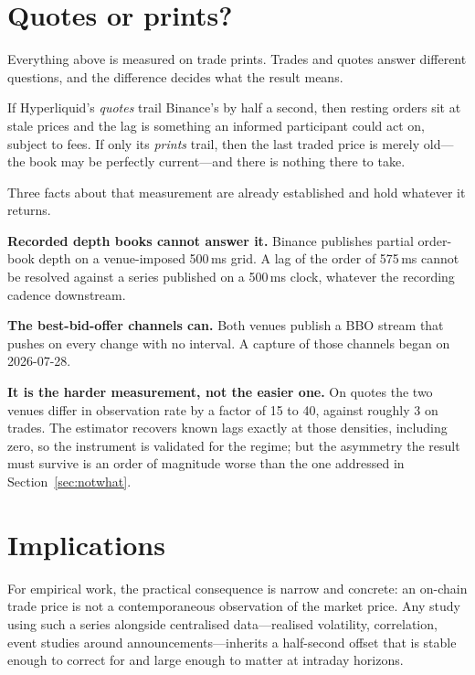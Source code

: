 \documentclass[11pt,a4paper]{article}
\begin{document}
\section{Quotes or prints?}
\label{sec:quotes}


Everything above is measured on trade prints. Trades and quotes answer different questions, and
the difference decides what the result means.

If Hyperliquid's \emph{quotes} trail Binance's by half a second, then resting orders sit at stale
prices and the lag is something an informed participant could act on, subject to fees. If only its
\emph{prints} trail, then the last traded price is merely old---the book may be perfectly
current---and there is nothing there to take.

Three facts about that measurement are already established and hold whatever it returns.

\textbf{Recorded depth books cannot answer it.} Binance publishes partial order-book depth on a
venue-imposed 500\,ms grid. A lag of the order of 575\,ms cannot be resolved against a series
published on a 500\,ms clock, whatever the recording cadence downstream.

\textbf{The best-bid-offer channels can.} Both venues publish a BBO stream that pushes on every
change with no interval. A capture of those channels began on 2026-07-28.

\textbf{It is the harder measurement, not the easier one.} On quotes the two venues differ in
observation rate by a factor of 15 to 40, against roughly 3 on trades. The estimator recovers
known lags exactly at those densities, including zero, so the instrument is validated for the
regime; but the asymmetry the result must survive is an order of magnitude worse than the one
addressed in Section~\ref{sec:notwhat}.

\section{Implications}

For empirical work, the practical consequence is narrow and concrete: an on-chain trade price is
not a contemporaneous observation of the market price. Any study using such a series alongside
centralised data---realised volatility, correlation, event studies around announcements---inherits
a half-second offset that is stable enough to correct for and large enough to matter at intraday
horizons.
\end{document}
